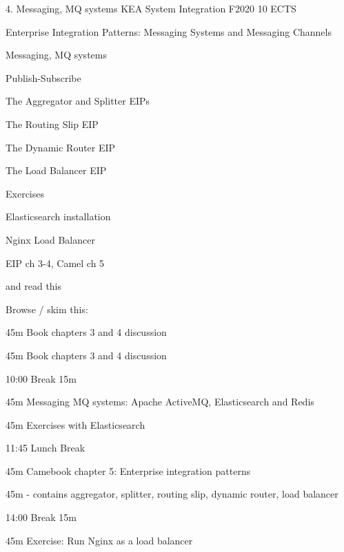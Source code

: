 \documentclass[Screen16to9,17pt]{foils}
\begin{document}
\mytitlepage
{4. Messaging, MQ systems}
{KEA System Integration F2020 10 ECTS}


\begin{list2}
\item Enterprise Integration Patterns: Messaging Systems and Messaging Channels
\item Messaging, MQ systems
\item Publish-Subscribe
\item The Aggregator and Splitter EIPs
\item The Routing Slip EIP
\item The Dynamic Router EIP
\item The Load Balancer EIP
\end{list2}

Exercises
\begin{list2}
\item Elasticsearch installation
\item Nginx Load Balancer
\end{list2}




\begin{list1}
\item EIP ch 3-4, Camel ch 5

and read this\\

\item Browse / skim this:\\

\end{list1}



\begin{list2}
\item 45m Book chapters 3 and 4 discussion
\item 45m Book chapters 3 and 4 discussion
\item 10:00 Break 15m
\item 45m Messaging MQ systems: Apache ActiveMQ, Elasticsearch and Redis
\item 45m Exercises with Elasticsearch
\item 11:45 Lunch Break
\item 45m Camebook chapter 5: Enterprise integration patterns
\item 45m - contains aggregator, splitter, routing slip, dynamic router, load balancer
\item 14:00 Break 15m
\item 45m Exercise: Run Nginx as a load balancer
\end{list2}
\end{document}
